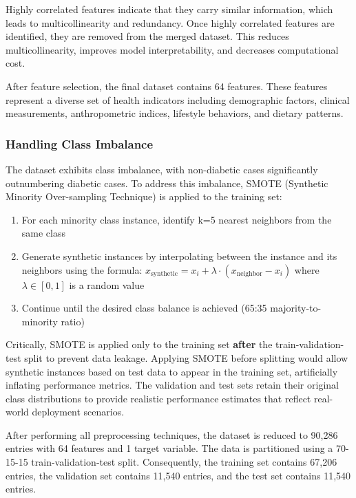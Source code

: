 Highly correlated features indicate that they carry similar information, which leads to multicollinearity and redundancy. Once highly correlated features are identified, they are removed from the merged dataset. This reduces multicollinearity, improves model interpretability, and decreases computational cost.

After feature selection, the final dataset contains 64 features. These features represent a diverse set of health indicators including demographic factors, clinical measurements, anthropometric indices, lifestyle behaviors, and dietary patterns.

\subsubsection{Handling Class Imbalance}

The dataset exhibits class imbalance, with non-diabetic cases significantly outnumbering diabetic cases. To address this imbalance, SMOTE (Synthetic Minority Over-sampling Technique) is applied to the training set:

\begin{enumerate}
    \item For each minority class instance, identify k=5 nearest neighbors from the same class
    \item Generate synthetic instances by interpolating between the instance and its neighbors using the formula: $x_{\mathrm{synthetic}} = x_i + \lambda \cdot (x_{\mathrm{neighbor}} - x_i)$ where $\lambda \in [0,1]$ is a random value
    \item Continue until the desired class balance is achieved (65:35 majority-to-minority ratio)
\end{enumerate}

Critically, SMOTE is applied only to the training set \textbf{after} the train-validation-test split to prevent data leakage. Applying SMOTE before splitting would allow synthetic instances based on test data to appear in the training set, artificially inflating performance metrics. The validation and test sets retain their original class distributions to provide realistic performance estimates that reflect real-world deployment scenarios.

After performing all preprocessing techniques, the dataset is reduced to 90,286 entries with 64 features and 1 target variable. The data is partitioned using a 70-15-15 train-validation-test split. Consequently, the training set contains 67,206 entries, the validation set contains 11,540 entries, and the test set contains 11,540 entries.

